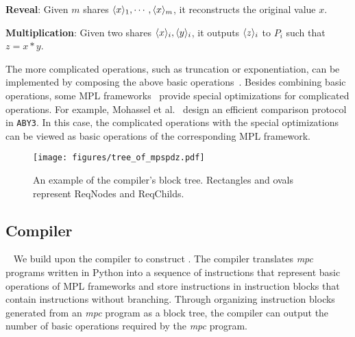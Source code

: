    \noindent \textbf{Reveal}: Given $m$ shares $\langle {x} \rangle_1, \cdots, \langle {x} \rangle_m$, it reconstructs the original value $x$.
   
   \noindent \textbf{Multiplication}: Given two shares $\langle {x} \rangle_i, \langle {y} \rangle_i$, it outputs $\langle {z} \rangle_i$ to $P_i$ such that $z = x*y$. 

The more complicated operations, such as truncation or exponentiation, can be implemented by composing the above basic operations~\cite{10.1007/978-3-642-15317-4_13, div2mp}. Besides combining basic operations, some MPL frameworks~\cite{mohassel2018aby3, aby,wagh2020falcon} provide special optimizations for complicated operations. For example, Mohassel et al.~\cite{mohassel2018aby3} design an efficient comparison protocol in \texttt{ABY3}. In this case, the complicated operations with the special optimizations can be viewed as basic operations of the corresponding MPL framework.
 \begin{figure}[htbp]
    \centering
    \texttt{[image: figures/tree\_of\_mpspdz.pdf]}
    \caption{An example of the \mpspdz compiler's block tree. Rectangles and ovals represent ReqNodes and ReqChilds.}
    \label{fig:overview_mpspdz}
\end{figure}


\subsection{\mpspdz Compiler}~\label{subsec:mpspdz_compiler}
We build upon the \mpspdz compiler to construct \hawkeye. The \mpspdz compiler translates \textit{mpc} programs written in Python into a sequence of instructions that represent basic operations of MPL frameworks and store instructions in instruction blocks that contain instructions without branching. Through organizing instruction blocks generated from an \textit{mpc} program as a block tree, the \mpspdz compiler can output the number of basic operations required by the \textit{mpc} program.

